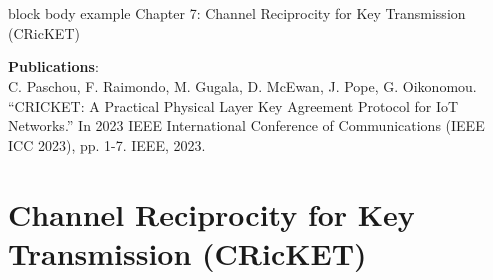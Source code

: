 \section*{}
\begin{frame}{}
\begin{beamercolorbox}[colsep=1.5pt,rounded=true,shadow=true]{block body example}
    \huge{Chapter 7: Channel Reciprocity for Key Transmission (CRicKET)}
\end{beamercolorbox}
\vspace{2cm}
\textbf{Publications}:\\
C. Paschou, F. Raimondo, M. Gugala, D. McEwan, J. Pope, G. Oikonomou.
    ``CRICKET: A Practical Physical Layer Key Agreement Protocol for IoT Networks.'' In 2023 IEEE International Conference of Communications (IEEE ICC 2023), pp. 1-7. IEEE, 2023.

\end{frame}

\section{Channel Reciprocity for Key Transmission (CRicKET)}

